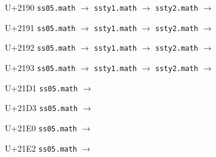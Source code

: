 \documentclass{article}
\begin{document}
\begin{substitutions}

U+2190  \linebreak
    \texttt{ss05.math} $\to$  \linebreak
    \texttt{ssty1.math} $\to$  \linebreak
    \texttt{ssty2.math} $\to$  

\goodbreak

U+2191  \linebreak
    \texttt{ss05.math} $\to$  \linebreak
    \texttt{ssty1.math} $\to$  \linebreak
    \texttt{ssty2.math} $\to$  

\goodbreak

U+2192  \linebreak
    \texttt{ss05.math} $\to$  \linebreak
    \texttt{ssty1.math} $\to$  \linebreak
    \texttt{ssty2.math} $\to$  

\goodbreak

U+2193  \linebreak
    \texttt{ss05.math} $\to$  \linebreak
    \texttt{ssty1.math} $\to$  \linebreak
    \texttt{ssty2.math} $\to$  

\goodbreak

U+21D1  \linebreak
    \texttt{ss05.math} $\to$  

\goodbreak

U+21D3  \linebreak
    \texttt{ss05.math} $\to$  

\goodbreak

U+21E0  \linebreak
    \texttt{ss05.math} $\to$  

\goodbreak

U+21E2  \linebreak
    \texttt{ss05.math} $\to$  

\goodbreak

\end{substitutions}
\end{document}
